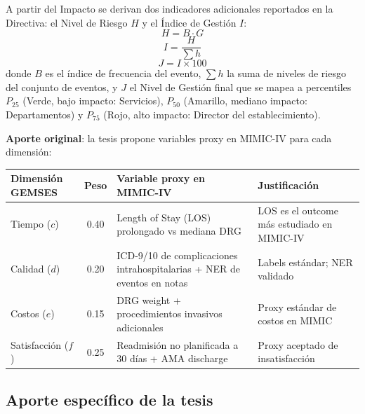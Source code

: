 \documentclass[11pt,a4paper]{article}
\begin{document}
A partir del Impacto se derivan dos indicadores adicionales reportados en la Directiva: el Nivel de Riesgo $H$ y el Índice de Gestión $I$:
\begin{equation}
H = B \cdot G
\end{equation}
\begin{equation}
I = \frac{H}{\sum h}
\end{equation}
\begin{equation}
J = I \times 100
\end{equation}
donde $B$ es el índice de frecuencia del evento, $\sum h$ la suma de niveles de riesgo del conjunto de eventos, y $J$ el Nivel de Gestión final que se mapea a percentiles $P_{25}$ (Verde, bajo impacto: Servicios), $P_{50}$ (Amarillo, mediano impacto: Departamentos) y $P_{75}$ (Rojo, alto impacto: Director del establecimiento).

\textbf{Aporte original}: la tesis propone variables proxy en MIMIC-IV para cada dimensión:

\begin{center}
\begin{tabularx}{\textwidth}{l c X X}
\toprule
\textbf{Dimensión GEMSES} & \textbf{Peso} & \textbf{Variable proxy en MIMIC-IV} & \textbf{Justificación} \\
\midrule
Tiempo ($c$)        & 0.40 & Length of Stay (LOS) prolongado vs mediana DRG     & LOS es el outcome más estudiado en MIMIC-IV~\cite{johnson2023,vanaken2024,hu2024} \\
Calidad ($d$)       & 0.20 & ICD-9/10 de complicaciones intrahospitalarias + NER de eventos en notas & Labels estándar; NER validado~\cite{modi2024,wang2024,mahendran2025} \\
Costos ($e$)        & 0.15 & DRG weight + procedimientos invasivos adicionales  & Proxy estándar de costos en MIMIC~\cite{hu2024} \\
Satisfacción ($f$)  & 0.25 & Readmisión no planificada a 30 días + AMA discharge & Proxy aceptado de insatisfacción~\cite{vanaken2024} \\
\bottomrule
\end{tabularx}
\end{center}

\subsection{Aporte específico de la tesis}
\end{document}
